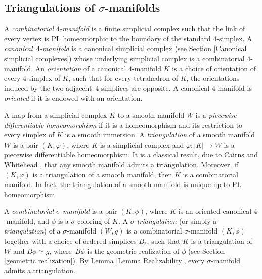 \documentclass[a4paper, oneside]{amsart}
\numberwithin{equation}{subsection}
\theoremstyle{referencedlemma}
\theoremstyle{plain} %
\theoremstyle{remark}
\begin{document}
\subsection{Triangulations of $\sigma$-manifolds}\label{Section-Triangulations}

A \emph{combinatorial $4$-manifold} is a finite simplicial complex such that the link of every vertex is PL homeomorphic to the boundary of the standard $4$-simplex.  A \emph{cano\-nical~$4$-manifold} is a canonical simplicial complex (see Section \ref{Canonical simplicial complexes}) whose underlying simplicial complex is a combinatorial \mbox{$4$-mani}\-fold.  An \emph{orientation} of a canonical $4$-manifold $K$ is a choice of orientation of every $4$-simplex of $K$, such that for every tetrahedron of $K$, the orientations induced by the two adjacent~$4$-simplices are opposite.  A canonical $4$-manifold is \emph{oriented} if it is endowed with an orientation.

A map from a simplicial complex $K$ to a smooth manifold $W$ is a \emph{piecewise differentiable homeomorphism} if it is a homeomorphism and its restriction to every simplex of $K$ is a smooth immersion.  A \emph{triangulation} of a smooth manifold $W$ is a pair $(K, \varphi)$, where $K$ is a simplicial complex and $\varphi\colon \lvert K\rvert \to W$ is a piecewise differentiable homeomorphism.  It is a classical result, due to Cairns \cite{cairnsTriangulationManifoldClass1935} and Whitehead \cite{whitehead_c1-complexes_1940}, that any smooth manifold admits a triangulation.  Moreover,  if $(K, \varphi)$ is a triangulation of a smooth manifold, then $K$ is a combinatorial manifold. In fact, the triangulation of a smooth manifold is unique up to PL homeomorphism.  

A \emph{combinatorial $\sigma$-manifold} is a pair $(K,\phi)$, where $K$ is an oriented canonical \mbox{$4$-mani}\-fold, and $\phi$ is a $\sigma$-coloring of $K$. A \emph{$\sigma$-triangulation} (or simply a \emph{triangulation}) of a $\sigma$-manifold $(W,g)$ is a combinatorial $\sigma$-manifold $(K,\phi)$ together with a choice of ordered simplices $B_*$, such that $K$ is a triangulation of $W$ and $B\phi \simeq g$, where~$B\phi$ is the geometric realization of $\phi$ (see Section \ref{geometric realization}).  By Lemma \ref{Lemma Realizability}, every $\sigma$-manifold admits a triangulation.  
\end{document}
